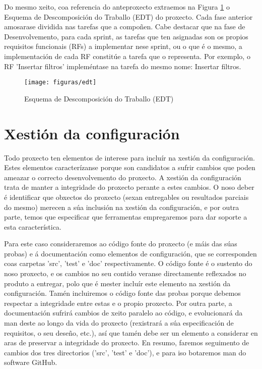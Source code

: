 Do mesmo xeito, coa referencia do anteproxecto extraemos na Figura \ref{edt} o Esquema de Descomposición do Traballo (EDT) do proxecto. Cada fase anterior amosarase dividida nas tarefas que a compoñen. Cabe destacar que na fase de Desenvolvemento, para cada sprint, as tarefas que ten asignadas son os propios requisitos funcionais (RFs) a implementar nese sprint, ou o que é o mesmo, a implementación de cada RF constitúe a tarefa que o representa. Por exemplo, o RF 'Insertar filtros' impleméntase na tarefa do mesmo nome: Insertar filtros.

\begin{figure}
\centering
\texttt{[image: figuras/edt]}
\caption{Esquema de Descomposición do Traballo (EDT)}
\label{edt}
\end{figure}

\section{Xestión da configuración}

Todo proxecto ten elementos de interese para incluír na xestión da configuración. Estes elementos caracterízanse porque son candidatos a sufrir cambios que poden ameazar o correcto desenvolvemento do proxecto. A xestión da configuración trata de manter a integridade do proxecto perante a estes cambios. O noso deber é identificar que obxectos do proxecto (sexan entregables ou resultados parciais do mesmo) merecen a súa inclusión na xestión da configuración, e por outra parte, temos que especificar que ferramentas empregaremos para dar soporte a esta característica.

Para este caso consideraremos ao código fonte do proxecto (e máis das súas probas) e á documentación como elementos de configuración, que se corresponden coas carpetas 'src', 'test' e 'doc' respectivamente. O código fonte é o sustento do noso proxecto, e os cambios no seu contido veranse directamente reflexados no produto a entregar, polo que é mester incluír este elemento na xestión da configuración. Tamén incluiremos o código fonte das probas porque debemos respectar a integridade entre estas e o propio proxecto. Por outra parte, a documentación sufrirá cambios de xeito paralelo ao código, e evolucionará da man deste ao longo da vida do proxecto (rexistrará a súa especificación de requisitos, o seu deseño, etc.), así que tamén debe ser un elemento a considerar en aras de preservar a integridade do proxecto. En resumo, faremos seguimento de cambios dos tres directorios ('src', 'test' e 'doc'), e para iso botaremos man do software GitHub\cite{github}.

